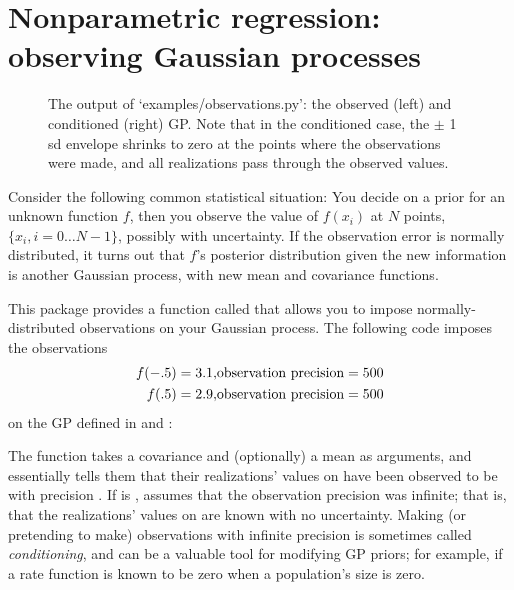 \documentclass{manual}
\begin{document}
\section{Nonparametric regression: observing Gaussian processes}\label{sec:observing} 

\begin{figure}
	\centering
	\caption{The output of {\sffamily `examples/observations.py'}: the observed (left) and conditioned (right) GP. Note that in the conditioned case, the $\pm$ 1 sd envelope shrinks to zero at the points where the observations were made, and all realizations pass through the observed values.}
	\label{fig:obs}
\end{figure}

Consider the following common statistical situation: You decide on a prior for an unknown function $f$, then you observe the value of $f(x_i)$ at $N$ points, $\{x_i, i=0\ldots N-1\}$, possibly with uncertainty. If the observation error is normally distributed, it turns out that $f$'s posterior distribution given the new information is another Gaussian process, with new mean and covariance functions.

This package provides a function called  that allows you to impose normally-distributed observations on your Gaussian process. The following code imposes the observations
\begin{eqnarray}
	f(-.5) = 3.1, & \textup{observation precision}=500\\
	f(.5) = 2.9, & \textup{observation precision}=500
\end{eqnarray}
on the GP defined in  and :
 

The function  takes a covariance   and (optionally) a mean  as arguments, and essentially tells them that their realizations' values on  have been observed to be  with precision . If  is ,  assumes that the observation precision was infinite; that is, that the realizations' values on  are known with no uncertainty. Making (or pretending to make) observations with infinite precision is sometimes called \emph{conditioning}, and can be a valuable tool for modifying GP priors; for example, if a rate function is known to be zero when a population's size is zero.
\end{document}
